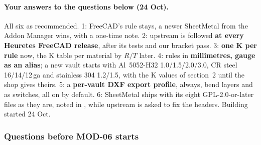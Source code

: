 \paragraph{Your answers to the questions below (24 Oct).} All six as recommended. 1: FreeCAD's rule stays, a newer
SheetMetal from the Addon Manager wins, with a one-time note. 2: upstream is followed \textbf{at every Heuretes FreeCAD
release}, after its tests and our bracket pass. 3: \textbf{one K per rule} now, the K table per material by $R/T$
later. 4: rules in \textbf{millimetres, gauge as an alias}; a new vault starts with Al~5052-H32 1.0/1.5/2.0/3.0, CR
steel 16/14/12\,ga and stainless 304 1.2/1.5, with the K values of section~2 until the shop gives theirs. 5: a
\textbf{per-vault DXF export profile},  always, bend layers and  as switches, all on by default.
6: SheetMetal ships with its eight GPL-2.0-or-later files as they are, noted in , while upstream is asked
to fix the headers. Building started 24 Oct.

\subsubsection*{Questions before MOD-06 starts}

